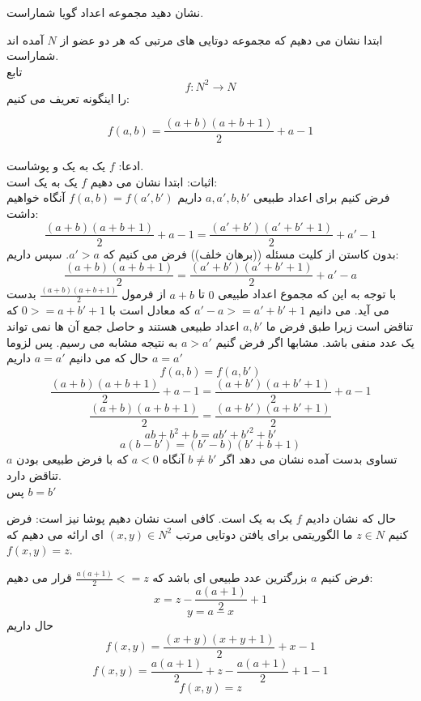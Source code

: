 
    نشان دهید مجموعه اعداد گویا شماراست.
    \begin{ans}
        ابتدا نشان می دهیم که مجموعه دوتایی های مرتبی که هر دو عضو از 
        $N$
        آمده اند شماراست.
        \\
        تابع
        \[f:N^{2}\rightarrow N\]
        را اینگونه تعریف می کنیم:

        \[f(a,b) = \frac{(a+b)(a+b+1)}{2} + a - 1\]
        \\
        ادعا: 
        $f$
        یک به یک و پوشاست. 
        \\
        اثبات:
        ابتدا نشان می دهیم 
        $f$
        یک به یک است:
        \\
        فرض کنیم برای اعداد طبیعی
        $a,a',b,b'$
        داریم
        $f(a,b) = f(a',b')$
        آنگاه خواهیم داشت:
        \[\frac{(a+b)(a+b+1)}{2} + a - 1 = \frac{(a'+b')(a'+b'+1)}{2} + a' - 1\]
        بدون کاستن از کلیت  مسئله ((برهان خلف)) فرض می کنیم که 
        $a' > a$.
        سپس داریم:
        \[\frac{(a+b)(a+b+1)}{2} = \frac{(a'+b')(a'+b'+1)}{2} + a' - a\]
        با توجه به این که مجموع اعداد طبیعی 
        $0$
        تا
        $a+b$
        از فرمول 
        $\frac{(a+b)(a+b+1)}{2}$
        بدست می آید. می دانیم 
        $a'-a >= a'+b'+1$
        که معادل است با
        $0 >= a + b' + 1$
        که تناقض است زیرا طبق فرض ما 
        $a,b'$
        اعداد طبیعی هستند و حاصل جمع آن ها نمی تواند یک عدد منفی باشد. مشابها اگر فرض گنیم
        $a > a'$
        به نتیجه مشابه می رسیم. پس لزوما
        $a = a'$
        حال که می دانیم
        $a = a'$
        داریم
        \[f(a,b) = f(a,b')\]
        \[\frac{(a+b)(a+b+1)}{2} + a - 1 = \frac{(a+b')(a+b'+1)}{2} + a - 1\]
        \[\frac{(a+b)(a+b+1)}{2} = \frac{(a+b')(a+b'+1)}{2}\]
        \[ab + b^{2} + b = ab' + b'^{2} + b'\]
        \[a(b-b') = (b'-b)(b'+b+1)\]
        تساوی بدست آمده نشان می دهد اگر 
        $b \neq b'$
        آنگاه 
        $a < 0$
        که با فرض طبیعی بودن 
        $a$
        تناقض دارد.
        \\
        پس 
        $b = b'$

        حال که نشان دادیم 
        $f$
        یک به یک است. کافی است نشان دهیم پوشا نیز است:
        فرض کنیم 
        $z \in N$
        ما الگوریتمی برای یافتن دوتایی مرتب 
        $(x,y) \in N^{2}$
        ای ارائه می دهیم که 
        $f(x,y) = z$.

        فرض کنیم 
        $a$
        بزرگترین عدد طبیعی ای باشد که 
        $\frac{a(a+1)}{2} <= z$
        قرار می دهیم:
        \[x = z - \frac{a(a+1)}{2} + 1\]
        \[y = a - x\]
        حال داریم
        \[f(x,y) = \frac{(x+y)(x+y+1)}{2} + x - 1\]
        \[f(x,y) = \frac{a(a+1)}{2} + z - \frac{a(a+1)}{2} + 1 -1\]
        \[f(x,y) = z\]


\end{ans}
